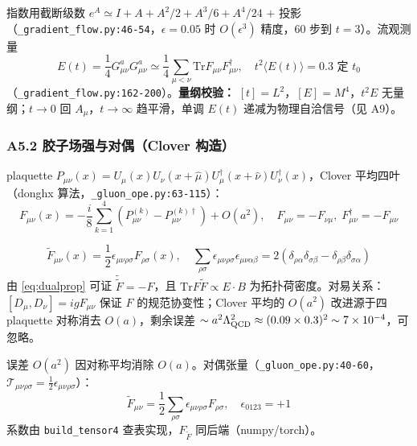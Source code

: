 \documentclass[UTF8]{ctexart}
\begin{document}
指数用截断级数 $e^A\simeq I+A+A^2/2+A^3/6+A^4/24$ $+$ 投影（\texttt{\nolinkurl{\_gradient\_flow.py:46-54}}，$\epsilon=0.05$ 时 $O(\epsilon^3)$ 精度，60 步到 $t=3$）。流观测量
\begin{equation}
E(t)=\frac14 G^{a}_{\mu\nu}G^{a}_{\mu\nu}\simeq \frac14\sum_{\mu<\nu}\mathrm{Tr} F_{\mu\nu}F^\dagger_{\mu\nu},\quad t^2\langle E(t)\rangle=0.3 \text{ 定 }t_0
\label{eq:Et0}
\end{equation}
（\texttt{\nolinkurl{\_gradient\_flow.py:162-200}}）。\textbf{量纲校验：} $[t]=L^2$，$[E]=M^4$，$t^2E$ 无量纲；$t\to0$ 回 $A_\mu$，$t\to\infty$ 趋平滑，单调 $E(t)$ 递减为物理自洽信号（见 A9）。

\subsubsection{A5.2 胶子场强与对偶（Clover 构造）}
plaquette $P_{\mu\nu}(x)=U_\mu(x)U_\nu(x+\hat\mu)U^\dagger_\mu(x+\hat\nu)U^\dagger_\nu(x)$，Clover 平均四叶（donghx 算法，\texttt{\nolinkurl{\_gluon\_ope.py:63-115}}）：
\begin{equation}
F_{\mu\nu}(x)= -\frac{i}{8}\sum_{k=1}^4\left(P^{(k)}_{\mu\nu}-P^{(k)\dagger}_{\mu\nu}\right)+O(a^2),\quad F_{\mu\nu}=-F_{\nu\mu},\;F^\dagger_{\mu\nu}=-F_{\mu\nu}
\label{eq:clover}
\end{equation}

\begin{equation}
\tilde F_{\mu\nu}(x)=\frac12\epsilon_{\mu\nu\rho\sigma}F_{\rho\sigma}(x),\quad 
\sum_{\rho\sigma}\epsilon_{\mu\nu\rho\sigma}\epsilon_{\mu\nu\alpha\beta}=2(\delta_{\rho\alpha}\delta_{\sigma\beta}-\delta_{\rho\beta}\delta_{\sigma\alpha})
\label{eq:dualprop}
\end{equation}
由 \eqref{eq:dualprop} 可证 $\tilde{\tilde F}=-F$，且 $\mathrm{Tr} F\tilde F\propto E\cdot B$ 为拓扑荷密度。对易关系：$[D_\mu,D_\nu]=igF_{\mu\nu}$ 保证 $F$ 的规范协变性；Clover 平均的 $O(a^2)$ 改进源于四 plaquette 对称消去 $O(a)$，剩余误差 $\sim a^2\Lambda_{\rm QCD}^2\approx(0.09\times0.3)^2\sim7\times10^{-4}$，可忽略。

误差 $O(a^2)$ 因对称平均消除 $O(a)$。对偶张量（\texttt{\nolinkurl{\_gluon\_ope.py:40-60}}，$\mathcal{T}_{\mu\nu\rho\sigma}=\frac12\epsilon_{\mu\nu\rho\sigma}$）：
\begin{equation}
\tilde F_{\mu\nu}= \frac12\sum_{\rho\sigma}\epsilon_{\mu\nu\rho\sigma}F_{\rho\sigma},\quad \epsilon_{0123}=+1
\label{eq:dual}
\end{equation}
系数由 \texttt{\nolinkurl{build\_tensor4}} 查表实现，$F_{\tilde F}$ 同后端（numpy/torch）。
\end{document}
